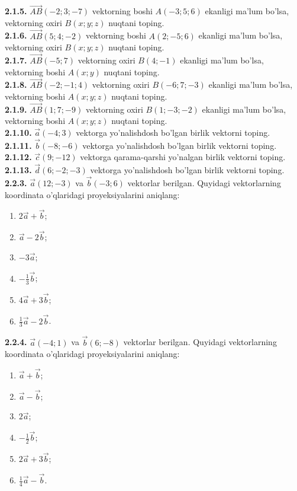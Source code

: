\documentclass[10pt]{article}
\begin{document}
\textbf{2.1.5.} $\overrightarrow{A B}(-2 ; 3 ;-7)$ vektorning boshi $A(-3 ; 5 ; 6)$ ekanligi ma'lum bo'lsa, vektorning oxiri $B(x ; y ; z)$ nuqtani toping.\\
\textbf{2.1.6.} $\overrightarrow{A B}(5 ; 4 ;-2)$ vektorning boshi $A(2 ;-5 ; 6)$ ekanligi ma'lum bo'lsa, vektorning oxiri $B(x ; y ; z)$ nuqtani toping.\\
\textbf{2.1.7.} $\overrightarrow{A B}(-5 ; 7)$ vektorning oxiri $B(4 ;-1)$ ekanligi ma'lum bo'lsa, vektorning boshi $A(x ; y)$ nuqtani toping.\\
\textbf{2.1.8.} $\overrightarrow{A B}(-2 ;-1 ; 4)$ vektorning oxiri $B(-6 ; 7 ;-3)$ ekanligi ma'lum bo'lsa, vektorning boshi $A(x ; y ; z)$ nuqtani toping.\\
\textbf{2.1.9.} $\overrightarrow{A B}(1 ; 7 ;-9)$ vektorning oxiri $B(1 ;-3 ;-2)$ ekanligi ma'lum bo'lsa, vektorning boshi $A(x ; y ; z)$ nuqtani toping.\\
\textbf{2.1.10.} $\vec{a}(-4 ; 3)$ vektorga yo'nalishdosh bo'lgan birlik vektorni toping.\\
\textbf{2.1.11.} $\vec{b}(-8 ;-6)$ vektorga yo'nalishdosh bo'lgan birlik vektorni toping.\\
\textbf{2.1.12.} $\vec{c}(9 ;-12)$ vektorga qarama-qarshi yo'nalgan birlik vektorni toping.\\
\textbf{2.1.13.} $\vec{d}(6 ;-2 ;-3)$ vektorga yo'nalishdosh bo'lgan birlik vektorni toping.\\
\textbf{2.2.3.} $\vec{a}(12 ;-3)$ va $\vec{b}(-3 ; 6)$ vektorlar berilgan. Quyidagi vektorlarning koordinata o'qlaridagi proyeksiyalarini aniqlang:

\begin{enumerate}[label=\alph*)]
  \item $2 \vec{a}+\vec{b}$;
  \item $\vec{a}-2 \vec{b}$;
  \item $-3 \vec{a}$;
  \item $-\frac{1}{3} \vec{b}$;
  \item $4 \vec{a}+3 \vec{b}$;
  \item $\frac{1}{3} \vec{a}-2 \vec{b}$.\\
\end{enumerate}

\textbf{2.2.4.} $\vec{a}(-4 ; 1)$ va $\vec{b}(6 ;-8)$ vektorlar berilgan. Quyidagi vektorlarning koordinata o'qlaridagi proyeksiyalarini aniqlang:
\begin{enumerate}
  \item $\vec{a}+\vec{b}$;
  \item $\vec{a}-\vec{b}$;
  \item $2 \vec{a}$;
  \item $-\frac{1}{2} \vec{b}$;
  \item $2 \vec{a}+3 \vec{b}$;
  \item $\frac{1}{4} \vec{a}-\vec{b}$.
\end{enumerate}\\
\end{document}
